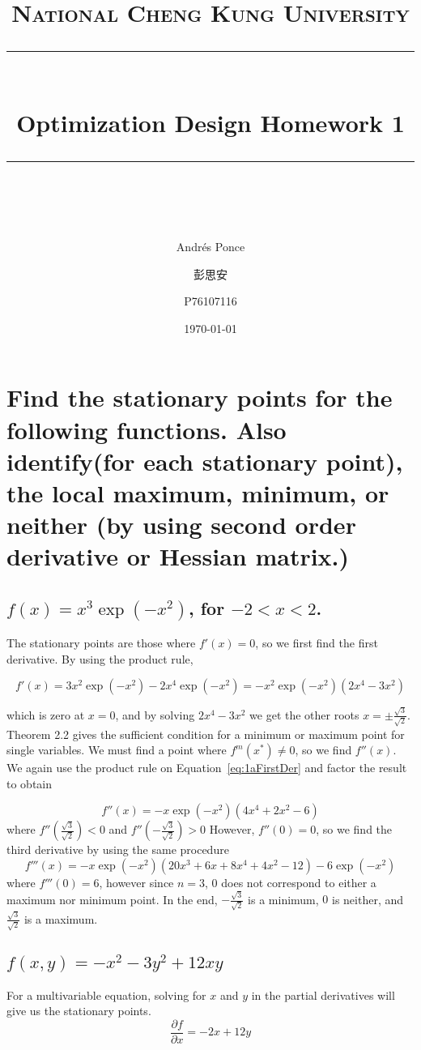 \documentclass[11pt]{scrartcl}
\title{ 
	\normalfont\normalsize
	\textsc{National Cheng Kung University}\\
	\vspace{25pt}
	\rule{\linewidth}{0.5pt}\\
	\vspace{20pt}
	{\huge Optimization Design Homework 1}\\
	\vspace{12pt}
	\rule{\linewidth}{2pt}\\
	\vspace{12pt}
}
\author{\Large Andr\'es Ponce \and 彭思安 \and P76107116}
\date{\normalsize\today}
\begin{document}
\maketitle
\section{Find the stationary points for the following functions. 
Also identify(for each stationary point), the local maximum, minimum,
or neither (by using second order derivative or Hessian matrix.)}

\subsection{$f(x) = x^{3}\exp(-x^2)$, for $-2<x<2$.}
The stationary points are those where $f'(x) = 0$, so we first find
the first derivative.
By using the product rule,

\begin{equation}
\label{eq:1aFirstDer}
f'(x) = 3x^{2}\exp(-x^{2}) -2x^{4}\exp(-x^{2}) = -x^2 \exp(-x^{2})(2x^4 - 3x^2)
\end{equation}

which is zero at $x=0$, and by solving $2x^4 - 3x^2$ we get the other roots $x=\pm\frac{\sqrt{3}}{\sqrt{2}}$.
Theorem 2.2 gives the sufficient condition for a minimum or maximum point for
single variables.
We must find a point where $f^{m}(x^{*}) \neq 0$, so we find $f''(x)$.
We again use the product rule on Equation~\ref{eq:1aFirstDer} and factor 
the result to obtain

\begin{equation}
	\label{eq:1aSecondDer}
	f''(x) = -x\exp(-x^{2})(4x^4 + 2x^2 -6)
\end{equation}
where $f''(\frac{\sqrt{3}}{\sqrt{2}}) < 0$ and $f''(-\frac{\sqrt{3}}{\sqrt{2}}) > 0$ However, $f''(0) = 0$,
so we find the third derivative by using the same procedure
\begin{equation}
\label{eq:1aThirdDer}
f'''(x) = -x\exp(-x^{2})(20x^3 + 6x + 8x^4 + 4x^2 -12) - 6\exp(-x^2)
\end{equation}
where $f'''(0)=6$, however since $n=3$, $0$ does not correspond to either
a maximum nor minimum point.
In the end, $-\frac{\sqrt{3}}{\sqrt{2}}$ is a minimum, $0$ is neither, and 
$\frac{\sqrt{3}}{\sqrt{2}}$ is a maximum.

\subsection{$f(x, y) = -x^2 -3y^2 + 12xy$}
For a multivariable equation, solving for $x$ and $y$ in the partial derivatives will give us
the stationary points.
\begin{equation}
	\label{eq:1bxFirstDer}
	\frac{\partial f}{\partial x} = -2x + 12y
\end{equation}
\end{document}

